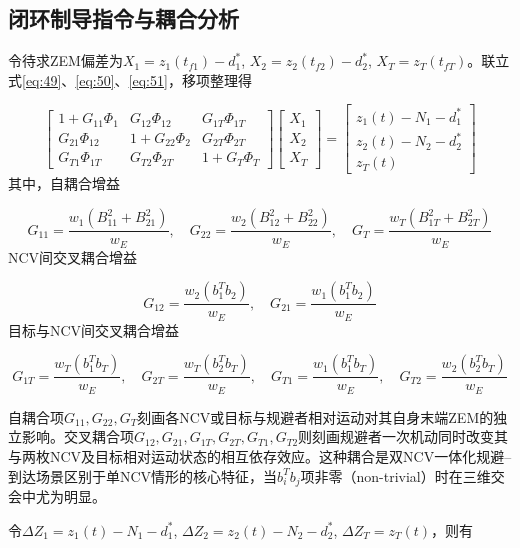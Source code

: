 \subsection{闭环制导指令与耦合分析}
令待求ZEM偏差为${X_1} = {z_1}({t_{f1}}) - d_1^*$, ${X_2} = {z_2}({t_{f2}}) - d_2^*$, ${X_T} = {z_T}({t_{fT}})$。联立式\eqref{eq:49}、\eqref{eq:50}、\eqref{eq:51}，移项整理得

\begin{equation}
\label{eq:56}
\left[ {\begin{array}{*{20}{c}}
  {1 + {G_{11}}{\Phi _1}}&{{G_{12}}{\Phi _{12}}}&{{G_{1T}}{\Phi _{1T}}} \\ 
  {{G_{21}}{\Phi _{12}}}&{1 + {G_{22}}{\Phi _2}}&{{G_{2T}}{\Phi _{2T}}} \\ 
  {{G_{T1}}{\Phi _{1T}}}&{{G_{T2}}{\Phi _{2T}}}&{1 + {G_T}{\Phi _T}} 
\end{array}} \right]
\begin{bmatrix}
  {X_1} \\
  {X_2} \\
  {X_T}
\end{bmatrix}
=
\begin{bmatrix}
  {z_1}(t) - {N_1} - d_1^* \\
  {z_2}(t) - {N_2} - d_2^* \\
  {z_T}(t)
\end{bmatrix}
\end{equation}
其中，自耦合增益

\begin{equation}
\label{eq:57}
{G_{11}} = \frac{{{w_1}(B_{11}^2 + B_{21}^2)}}{{{w_E}}},\quad {G_{22}} = \frac{{{w_2}(B_{12}^2 + B_{22}^2)}}{{{w_E}}},\quad {G_T} = \frac{{{w_T}(B_{1T}^2 + B_{2T}^2)}}{{{w_E}}}
\end{equation}
NCV间交叉耦合增益

\begin{equation}
\label{eq:58}
{G_{12}} = \frac{{{w_2}(b_1^T{b_2})}}{{{w_E}}},\quad {G_{21}} = \frac{{{w_1}(b_1^T{b_2})}}{{{w_E}}}
\end{equation}
目标与NCV间交叉耦合增益

\begin{equation}
\label{eq:59}
{G_{1T}} = \frac{{{w_T}(b_1^T{b_T})}}{{{w_E}}},\quad {G_{2T}} = \frac{{{w_T}(b_2^T{b_T})}}{{{w_E}}},\quad {G_{T1}} = \frac{{{w_1}(b_1^T{b_T})}}{{{w_E}}},\quad {G_{T2}} = \frac{{{w_2}(b_2^T{b_T})}}{{{w_E}}}
\end{equation}
\begin{remark}
自耦合项${G_{11}},{G_{22}},{G_T}$刻画各NCV或目标与规避者相对运动对其自身末端ZEM的独立影响。交叉耦合项${G_{12}},{G_{21}},{G_{1T}},{G_{2T}},{G_{T1}},{G_{T2}}$则刻画规避者一次机动同时改变其与两枚NCV及目标相对运动状态的相互依存效应。这种耦合是双NCV一体化规避–到达场景区别于单NCV情形的核心特征，当$b_i^T{b_j}$项非零（non-trivial）时在三维交会中尤为明显。
\end{remark}
令$\Delta {Z_1} = {z_1}(t) - {N_1} - d_1^*$, $\Delta {Z_2} = {z_2}(t) - {N_2} - d_2^*$, $\Delta {Z_T} = {z_T}(t)$，则有

